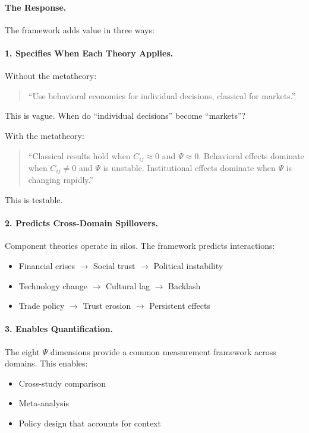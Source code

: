 \paragraph{The Response.}
The framework adds value in three ways:

\paragraph{1. Specifies When Each Theory Applies.}
Without the metatheory:
\begin{quote}
``Use behavioral economics for individual decisions, classical for markets.''
\end{quote}
This is vague. When do ``individual decisions'' become ``markets''?

With the metatheory:
\begin{quote}
``Classical results hold when $C_{ij} \approx 0$ and $\dot{\Psi} \approx 0$. Behavioral effects dominate when $C_{ij} \neq 0$ and $\Psi$ is unstable. Institutional effects dominate when $\Psi$ is changing rapidly.''
\end{quote}
This is testable.

\paragraph{2. Predicts Cross-Domain Spillovers.}
Component theories operate in silos. The framework predicts interactions:
\begin{itemize}
    \item Financial crises $\rightarrow$ Social trust $\rightarrow$ Political instability
    \item Technology change $\rightarrow$ Cultural lag $\rightarrow$ Backlash
    \item Trade policy $\rightarrow$ Trust erosion $\rightarrow$ Persistent effects
\end{itemize}

\paragraph{3. Enables Quantification.}
The eight $\Psi$ dimensions provide a common measurement framework across domains. This enables:
\begin{itemize}
    \item Cross-study comparison
    \item Meta-analysis
    \item Policy design that accounts for context
\end{itemize}


